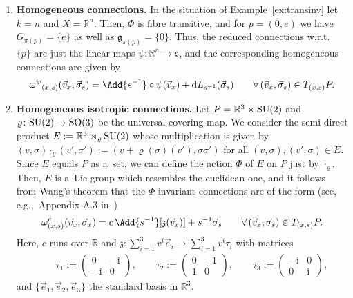 \documentclass[pdftex]{sigma}
\numberwithin{equation}{section}
\begin{document}
\begin{Example}\label{ex:eukl}\quad
\begin{enumerate}\itemsep=0pt
\item
\textbf{Homogeneous connections.}
In the situation of Example~\ref{ex:transinv} let $k=n$ and $X=\mathbb{R}^n$.
Then, $\Phi$ is f\/ibre transitive, and for $p=(0,e)$ we have $G_{\pi(p)}=\{e\}$ as well as $\mathfrak{g}_{\pi(p)}=\{0\}$.
Thus, the reduced connections w.r.t.~$\{p\}$ are just the linear maps $\psi\colon \mathbb{R}^n \rightarrow
\mathfrak{s}$, and the corresponding homogeneous connections are given by
\begin{gather*}
{\omega^\psi}_{(x,s)}(\vec{v}_x,\vec{\sigma}_s)=\Add{s^{-1}}\circ\psi(\vec{v}_x)+\mathrm{d} L_{s^{-1}}(\vec{\sigma}_s)
\qquad\forall\, (\vec{v}_x,\vec{\sigma}_s)\in T_{(x,s)}P.
\end{gather*}
\item
\textbf{Homogeneous isotropic connections.}
Let $P=\mathbb{R}^3 \times {\rm SU}(2)$ and $\varrho \colon {\rm SU}(2) \rightarrow {\rm SO}(3)$ be the universal covering map.
We consider the semi direct product $E:=\mathbb{R}^3 \rtimes_\varrho {\rm SU}(2)$ whose multiplication is given by
$(v,\sigma)\cdot_\varrho (v',\sigma'):=(v+\varrho(\sigma)(v'),\sigma\sigma')$ for all $(v,\sigma),(v',\sigma)\in E$.
Since $E$ equals $P$ as a~set, we can def\/ine the action $\Phi$ of $E$ on $P$ just by $\cdot_\varrho$.
Then, $E$ is a~Lie group which resembles the euclidean one, and it follows from Wang's theorem that the $\Phi$-invariant
connections are of the form (see, e.g.,\ Appendix A.3 in~\cite{InvConnLQG}) \begin{gather*}
\omega^c_{(x,s)}(\vec{v}_x,\vec{\sigma}_x)= c\, \Add{s^{-1}}[{\mathfrak{z}}(\vec{v}_x)]+s^{-1}\vec{\sigma}_s
\qquad\forall\, (\vec{v}_x,\vec{\sigma}_s)\in T_{(x,s)}P.
\end{gather*}
Here, $c$ runs over $\mathbb{R}$ and ${\mathfrak{z}}\colon \textstyle\sum\limits_{i=1}^3 v^i \vec{e}_i\rightarrow
\sum\limits_{i=1}^3 v^i \tau_i$ with matrices
\begin{gather*}
\qquad
\tau_1:=
\begin{pmatrix}
0 & -\mathrm{i}
\\
-\mathrm{i} & 0
\end{pmatrix},
\qquad
\tau_2:=
\begin{pmatrix}
0 & -1
\\
1 & 0
\end{pmatrix},
\qquad
\tau_3:=
\begin{pmatrix}
-\mathrm{i} & 0
\\
0 & \mathrm{i}
\end{pmatrix},
\end{gather*}
and $\{\vec{e}_1,\vec{e}_2,\vec{e}_3\}$ the standard basis in $\mathbb{R}^3$.
\end{enumerate}
\end{Example}
\end{document}

